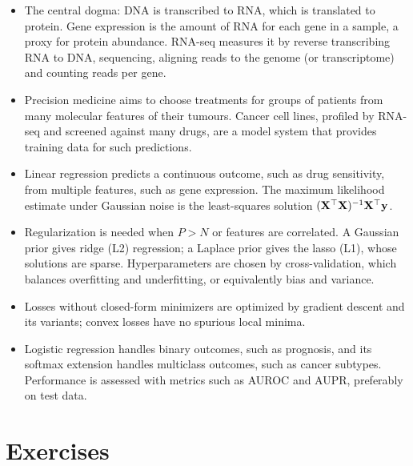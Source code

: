 \begin{itemize}
  \item The central dogma: DNA is transcribed to RNA, which is translated to protein. Gene expression is the amount of RNA for each gene in a sample, a proxy for protein abundance. RNA-seq measures it by reverse transcribing RNA to DNA, sequencing, aligning reads to the genome (or transcriptome) and counting reads per gene.
  \item Precision medicine aims to choose treatments for groups of patients from many molecular features of their tumours. Cancer cell lines, profiled by RNA-seq and screened against many drugs, are a model system that provides training data for such predictions.
  \item Linear regression predicts a continuous outcome, such as drug sensitivity, from multiple features, such as gene expression. The maximum likelihood estimate under Gaussian noise is the least-squares solution $(\mathbf{X}^\top\mathbf{X})^{-1}\mathbf{X}^\top\mathbf{y}$.
  \item Regularization is needed when $P>N$ or features are correlated. A Gaussian prior gives ridge (L2) regression; a Laplace prior gives the lasso (L1), whose solutions are sparse. Hyperparameters are chosen by cross-validation, which balances overfitting and underfitting, or equivalently bias and variance.
  \item Losses without closed-form minimizers are optimized by gradient descent and its variants; convex losses have no spurious local minima.
  \item Logistic regression handles binary outcomes, such as prognosis, and its softmax extension handles multiclass outcomes, such as cancer subtypes. Performance is assessed with metrics such as AUROC and AUPR, preferably on test data.
\end{itemize}

\section*{Exercises}

